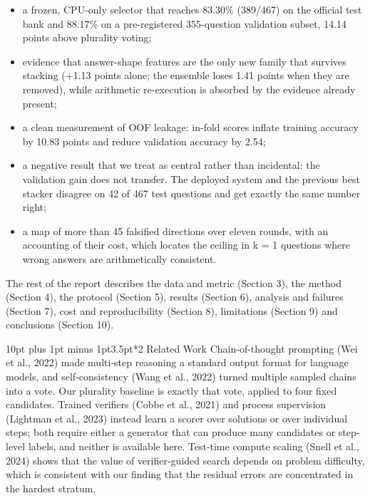 \documentclass[10pt,a4paper]{article}
\makeatletter
\renewcommand\section{\@startsection{section}{1}{\z@}%
  {10pt plus 1pt minus 1pt}{3.5pt}{\normalfont\large\bfseries}}
\makeatother
\begin{document}
\begin{itemize}
\setlength{\itemsep}{1.5pt}
\setlength{\parskip}{0pt}
\item a frozen, CPU-only selector that reaches 83.30\% (389/467) on the official test bank and 88.17\% on a pre-registered 355-question validation subset, 14.14 points above plurality voting;
\item evidence that answer-shape features are the only new family that survives stacking (+1.13 points alone; the ensemble loses 1.41 points when they are removed), while arithmetic re-execution is absorbed by the evidence already present;
\item a clean measurement of OOF leakage: in-fold scores inflate training accuracy by 10.83 points and reduce validation accuracy by 2.54;
\item a negative result that we treat as central rather than incidental: the validation gain does not transfer. The deployed system and the previous best stacker disagree on 42 of 467 test questions and get exactly the same number right;
\item a map of more than 45 falsified directions over eleven rounds, with an accounting of their cost, which locates the ceiling in k = 1 questions where wrong answers are arithmetically consistent.
\end{itemize}
\vspace{2pt}
The rest of the report describes the data and metric (Section 3), the method (Section 4), the protocol (Section 5), results (Section 6), analysis and failures (Section 7), cost and reproducibility (Section 8), limitations (Section 9) and conclusions (Section 10).

\section*{2 Related Work}
Chain-of-thought prompting (Wei et al., 2022) made multi-step reasoning a standard output format for language models, and self-consistency (Wang et al., 2022) turned multiple sampled chains into a vote. Our plurality baseline is exactly that vote, applied to four fixed candidates. Trained verifiers (Cobbe et al., 2021) and process supervision (Lightman et al., 2023) instead learn a scorer over solutions or over individual steps; both require either a generator that can produce many candidates or step-level labels, and neither is available here. Test-time compute scaling (Snell et al., 2024) shows that the value of verifier-guided search depends on problem difficulty, which is consistent with our finding that the residual errors are concentrated in the hardest stratum.
\end{document}
